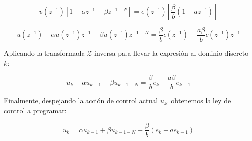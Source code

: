 \[
  u(z^{-1}) \left[ 1 - \alpha z^{-1} - \beta z^{-1-N} \right] = e(z^{-1}) \left[ \frac{\beta}{b} (1 - a z^{-1}) \right]
\]

\[
  u(z^{-1}) - \alpha u(z^{-1})z^{-1} - \beta u(z^{-1})z^{-1-N} = \frac{\beta}{b} e(z^{-1}) - \frac{a\beta}{b} e(z^{-1})z^{-1}
\]

Aplicando la transformada $\mathcal{Z}$ inversa para llevar la expresión al dominio discreto $k$:

\[
  u_k - \alpha u_{k-1} - \beta u_{k-1-N} = \frac{\beta}{b} e_k - \frac{a\beta}{b} e_{k-1}
\]

Finalmente, despejando la acción de control actual $u_k$, obtenemos la ley de control a programar:

\begin{equation}
  u_k = \alpha u_{k-1} + \beta u_{k-1-N} + \frac{\beta}{b} \left( e_k - a e_{k-1} \right)
\end{equation}
